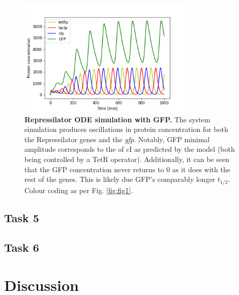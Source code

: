 \documentclass[runningheads,a4paper]{llncs}
\begin{document}
\vspace{-2.2\abovedisplayskip}
\begin{figure}[H]
    \singlespacing
    \centering
    \includegraphics[width=0.75\textwidth,trim={0 0.1cm 0 1.2cm},clip]{suplementary_information_and_code/Task4_figure1.png}
    \caption{\textbf{Repressilator ODE simulation with GFP.} The system simulation produces oscillations in protein concentration for both the Repressilator genes and the \textit{gfp}. Notably, GFP minimal amplitude corresponds to the of cI as predicted by the model (both being controlled by a TetR operator). Additionally, it can be seen that the GFP concentration never returns to 0 as it does with the rest of the genes. This is likely due GFP's comparably longer $t_{1/2}$. Colour coding as per Fig. \ref{fig:fig1}.}
    \label{fig:fig12}
\end{figure}

\subsection*{Task 5}
\subsection*{Task 6}

\section*{Discussion}


%
\clearpage

\singlespacing
\twocolumn
\raggedright
\raggedbottom
{}
%
\small{}

%
\end{document}
